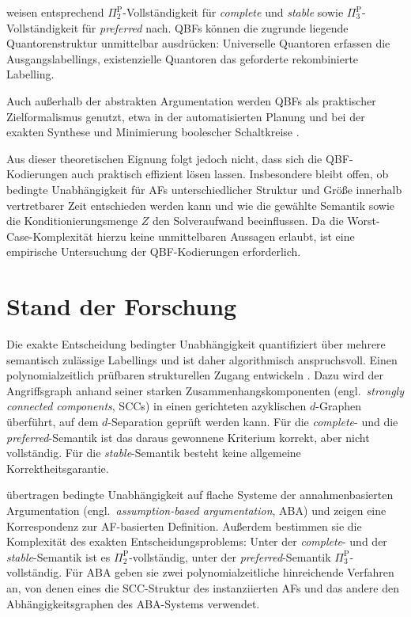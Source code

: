 \textcite{bluemel:2025:independence-aba} weisen entsprechend
\(\Pi_2^{\mathrm{P}}\)-Vollständigkeit für \emph{complete} und
\emph{stable} sowie \(\Pi_3^{\mathrm{P}}\)-Vollständigkeit für
\emph{preferred} nach. QBFs können die zugrunde liegende
Quantorenstruktur unmittelbar ausdrücken: Universelle Quantoren
erfassen die Ausgangslabellings, existenzielle Quantoren das geforderte
rekombinierte Labelling.

Auch außerhalb der abstrakten Argumentation werden QBFs als praktischer
Zielformalismus genutzt, etwa in der automatisierten Planung
\parencite{cashmore:etal:2013:planning-qbf} und bei der exakten
Synthese und Minimierung boolescher Schaltkreise
\parencite{reichl:etal:2023:circuit-qbf}.

Aus dieser theoretischen Eignung folgt jedoch nicht, dass sich die
QBF-Kodierungen auch praktisch effizient lösen lassen. Insbesondere
bleibt offen, ob bedingte Unabhängigkeit für AFs unterschiedlicher
Struktur und Größe innerhalb vertretbarer Zeit entschieden werden kann
und wie die gewählte Semantik sowie die Konditionierungsmenge \(Z\)
den Solveraufwand beeinflussen. Da die Worst-Case-Komplexität hierzu
keine unmittelbaren Aussagen erlaubt, ist eine empirische Untersuchung
der QBF-Kodierungen erforderlich.

\section{Stand der Forschung}
\label{sec:einleitung-related-work}

Die exakte Entscheidung bedingter Unabhängigkeit quantifiziert über
mehrere semantisch zulässige Labellings und ist daher algorithmisch
anspruchsvoll. Einen polynomialzeitlich prüfbaren strukturellen Zugang
entwickeln \textcite{rienstra:2020:independence-af}. Dazu wird der
Angriffsgraph anhand seiner starken Zusammenhangskomponenten
(engl.\ \emph{strongly connected components}, SCCs) in einen
gerichteten azyklischen \(d\)-Graphen überführt, auf dem
\(d\)-Separation geprüft werden kann. Für die \emph{complete}- und die
\emph{preferred}-Semantik ist das daraus gewonnene Kriterium korrekt,
aber nicht vollständig. Für die \emph{stable}-Semantik besteht keine
allgemeine Korrektheitsgarantie.

\textcite{bluemel:2025:independence-aba} übertragen bedingte
Unabhängigkeit auf flache Systeme der annahmenbasierten Argumentation
(engl.\ \emph{assumption-based argumentation}, ABA) und zeigen eine
Korrespondenz zur AF-basierten Definition. Außerdem bestimmen sie die
Komplexität des exakten Entscheidungsproblems:
Unter der \emph{complete}- und der \emph{stable}-Semantik ist es
\(\Pi_2^{\mathrm{P}}\)-vollständig, unter der
\emph{preferred}-Semantik \(\Pi_3^{\mathrm{P}}\)-vollständig. Für ABA
geben sie zwei polynomialzeitliche hinreichende Verfahren an, von denen
eines die SCC-Struktur des instanziierten AFs und das andere den
Abhängigkeitsgraphen des ABA-Systems verwendet.

